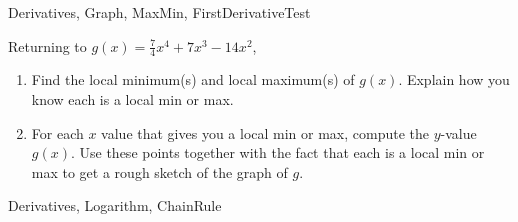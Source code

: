 \begin{tagblock}{Derivatives, Graph, MaxMin, FirstDerivativeTest}
\begin{question}

Returning to $\displaystyle g(x) = \frac{7}{4} x^4 + 7x^3 - 14x^2$,

\begin{enumerate}
\item Find the local minimum(s) and local maximum(s) of $g(x)$.  Explain how you know each is a local min or max.  

\vspace{2in}
\item For each $x$ value that gives you a local min or max, compute the $y$-value $g(x)$.  Use these points together with the fact that each is a local min or max to get a rough sketch of the graph of $g$. 
\vspace{.5in}


\end{enumerate}



	
\begin{tags}
	   Derivatives, Logarithm, ChainRule
\end{tags}
	
\begin{diary}
\end{diary}
	
\begin{solution}
	   
\end{solution}
	
\end{question}

\end{tagblock}



